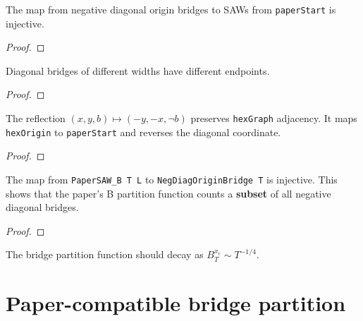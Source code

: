 \begin{lemma}\label{lem:diag_bridge_saw}
\leanok
{}
  The map from negative diagonal origin bridges to SAWs from
  \texttt{paperStart} is injective.
\end{lemma}
\begin{proof}
\leanok
\end{proof}

\begin{lemma}\label{lem:diag_endpoints}
\leanok
{}
  Diagonal bridges of different widths have different endpoints.
\end{lemma}
\begin{proof}
\leanok
\end{proof}

\begin{lemma}\label{lem:hex_reflect}
\leanok
{}
  The reflection $(x,y,b) \mapsto (-y,-x,\lnot b)$ preserves
  \texttt{hexGraph} adjacency. It maps \texttt{hexOrigin} to
  \texttt{paperStart} and reverses the diagonal coordinate.
\end{lemma}
\begin{proof}
\leanok
\end{proof}

\begin{lemma}\label{lem:paper_b_embed}
\leanok
{}
  The map from \texttt{PaperSAW\_B T L} to \texttt{NegDiagOriginBridge T}
  is injective. This shows that the paper's B partition function counts
  a \textbf{subset} of all negative diagonal bridges.
\end{lemma}
\begin{proof}
\leanok
\end{proof}

\begin{conjecture}\label{conj:bridge_decay}
\leanok
{}
  The bridge partition function should decay as $B_T^{x_c} \sim T^{-1/4}$.
\end{conjecture}

\section{Paper-compatible bridge partition}

